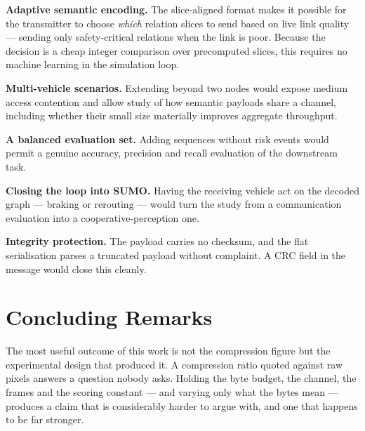 \documentclass{iutbscthesis}
\begin{document}
\textbf{Adaptive semantic encoding.} The slice-aligned format makes it possible
for the transmitter to choose \emph{which} relation slices to send based on
live link quality --- sending only safety-critical relations when the link is
poor. Because the decision is a cheap integer comparison over precomputed
slices, this requires no machine learning in the simulation loop.

\textbf{Multi-vehicle scenarios.} Extending beyond two nodes would expose
medium access contention and allow study of how semantic payloads share a
channel, including whether their small size materially improves aggregate
throughput.

\textbf{A balanced evaluation set.} Adding sequences without risk events would
permit a genuine accuracy, precision and recall evaluation of the downstream
task.

\textbf{Closing the loop into SUMO.} Having the receiving vehicle act on the
decoded graph --- braking or rerouting --- would turn the study from a
communication evaluation into a cooperative-perception one.

\textbf{Integrity protection.} The payload carries no checksum, and the flat
serialisation parses a truncated payload without complaint. A CRC field in the
message would close this cleanly.

\section{Concluding Remarks}

The most useful outcome of this work is not the compression figure but the
experimental design that produced it. A compression ratio quoted against raw
pixels answers a question nobody asks. Holding the byte budget, the channel,
the frames and the scoring constant --- and varying only what the bytes mean
--- produces a claim that is considerably harder to argue with, and one that
happens to be far stronger.

\printbib
\end{document}
